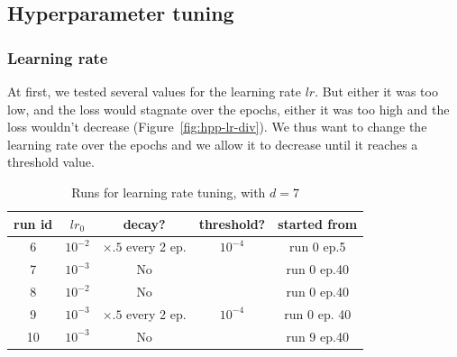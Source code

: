 \documentclass{article}
\begin{document}
    \subsection{Hyperparameter tuning}
        \subsubsection{Learning rate}

            At first, we tested several values for the learning rate $lr$. But either it was too low, and the loss would stagnate over the epochs, either it was too high and the loss wouldn't decrease (Figure~\ref{fig:hpp-lr-div}). We thus want to change the learning rate over the epochs and we allow it to decrease until it reaches a threshold value.

            \begin{table}[!ht]
                \centering
                \begin{tabular}{|c|c|c|c|c|}
                    \hline
                    run id & $lr_0$ & decay? & threshold? & started from\\
                    \hline
                    \hline
                    6 & $10^{-2}$ & $\times .5$ every 2 ep. & $10^{-4}$ & run 0 ep.5 \\
                    \hline
                    7 & $10^{-3}$ & No & & run 0 ep.40 \\
                    \hline
                    8 & $10^{-2}$ & No & & run 0 ep.40 \\
                    \hline
                    9 & $10^{-3}$ & $\times .5$ every 2 ep. & $10^{-4}$ & run 0 ep. 40 \\
                    \hline
                    10 & $10^{-3}$ & No & & run 9 ep.40\\
                    \hline
                \end{tabular}
            \caption{Runs for learning rate tuning, with $d=7$}
            \end{table}
\end{document}
